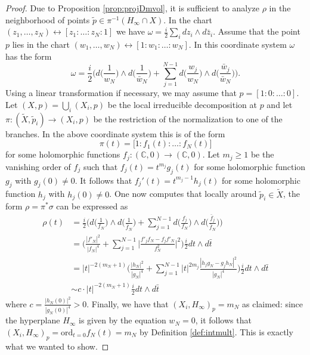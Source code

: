 \documentclass[11pt]{amsart}
\theoremstyle{definition}
\newcommand{\bC}{{\mathbb C}}
\begin{document}
\begin{proof}
    Due to Proposition \ref{prop:projDmvol}, it is sufficient to analyze $\rho$ in the neighborhood of points $\tilde{p} \in \pi^{-1}(H_\infty \cap X)$. In the chart $(z_1,\dots,z_N) \leftrightarrow [z_1:\dots:z_N:1]$ we have $\omega = \frac{i}{2}\sum_idz_i\wedge d\bar{z}_i$. Assume that the point $p$ lies in the chart $(w_1,\dots,w_N) \leftrightarrow [1:w_1:\dots:w_N]$. In this coordinate system $\omega$ has the form
        $$\omega = \frac{i}{2}\Bigg( d\bigg( \frac{1}{w_N}\bigg)\wedge d\bigg( \frac{1}{\bar{w}_N}\bigg) + \sum_{j=1}^{N-1}d\bigg( \frac{w_j}{w_N}\bigg)\wedge d\bigg( \frac{\bar{w}_j}{\bar{w}_N}\bigg) \Bigg).$$
    Using a linear transformation if necessary, we may assume that $p=[1:0:\dots:0]$. Let $(X,p)= \bigcup_i(X_i,p)$ be the local irreducible decomposition at $p$ and let $\pi : (\widetilde{X},\tilde{p}_i) \to (X_i,p)$ be the restriction of the normalization to one of the branches. In the above coordinate system this is of the form
    $$\pi(t) = \big[ 1 : f_1(t): \dots : f_N(t) \big]$$
    for some holomorphic functions $f_j : (\bC,0) \to (\bC,0)$. Let $m_j\geq 1$ be the vanishing order of $f_j$ such that $f_j(t) = t^{m_j}g_j(t)$ for some holomorphic function $g_j$ with $g_j(0)\neq 0$. It follows that $f_j'(t) = t^{m_j-1}h_j(t)$ for some holomorphic function $h_j$ with $h_j(0) \neq 0$. One now computes that locally around $\tilde{p}_i \in \widetilde{X}$, the form $\rho = \pi^*\sigma$ can be expressed as
    \begin{align*}
        \rho(t) &= \frac{i}{2}\Bigg( d\bigg( \frac{1}{f_N}\bigg)\wedge d\bigg( \frac{1}{\bar{f}_N}\bigg) + \sum_{j=1}^{N-1}d\bigg( \frac{f_j}{f_N}\bigg)\wedge d\bigg( \frac{\bar{f}_j}{\bar{f}_N}\bigg) \Bigg)\\
        &= \Bigg( \frac{|f'_N|^2}{|f_N|^4} + \sum_{j=1}^{N-1} \bigg| \frac{f'_jf_N-f_jf'_N}{f_N^2} \bigg|^2  \Bigg) \frac{i}{2} dt\wedge d\bar{t}\\
        &= |t|^{-2(m_N+1)}\Bigg( \frac{|h_N|^2}{|g_N|^4}+\sum_{j=1}^{N-1}|t|^{2m_j}\frac{|h_jg_N-g_jh_N|^2}{|g_N|^4}  \Bigg)\frac{i}{2}dt\wedge d\bar{t}\\
        &\sim c \cdot |t|^{-2(m_N+1)}\frac{i}{2}dt\wedge d\bar{t}
    \end{align*}
    where $c =\frac{|h_N(0)|^2}{|g_N(0)|^4} > 0$. Finally, we have that $(X_i,H_\infty)_p= m_N$ as claimed: since the hyperplane $H_\infty$ is given by the equation $w_N=0$, it follows that $(X_i,H_\infty)_p = \text{ord}_{t=0}f_N(t) = m_N$ by Definition \ref{def:intmult}. This is exactly what we wanted to show.
\end{proof}
\end{document}
